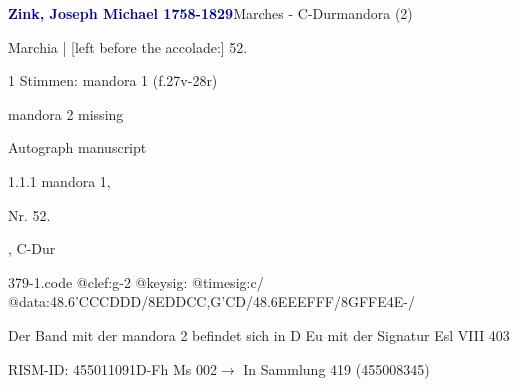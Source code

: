 \documentclass[twocolumn]{book}
\begin{document}
\par \vspace{7pt} \textcolor{darkblue}{\textbf{Zink, Joseph Michael  1758-1829}}\hfillplus{\textbf{[379]}}\newline Marches - C-Dur\newline mandora (2)
\par \begin{itshape}[f.27v, at left:] Marchia | [left before the accolade:] 52.\end{itshape} 
\par \textcolor{darkblue}{}  1 Stimmen: mandora 1  (f.27v-28r)\newline \begin{small} mandora 2 missing\end{small} \newline Autograph manuscript
\par 1.1.1  mandora 1, \begin{itshape}Nr. 52.\end{itshape}, C-Dur  
\begin{filecontents*}{379-1.code}
@clef:g-2
@keysig:
@timesig:c/
@data:48.6'C{CC}D{DD}/{8EDDC}{C,G'CD}/48.6E{EE}F{FF}/{8GFFE}4E-/
\end{filecontents*}
\newline
%
\par Der Band mit der mandora 2 befindet sich in D Eu mit der Signatur Esl VIII 403
\par RISM-ID: 455011091\newline D-Fh  Ms 002\newline $\rightarrow$ In Sammlung 419 (455008345)
      
\end{document}
